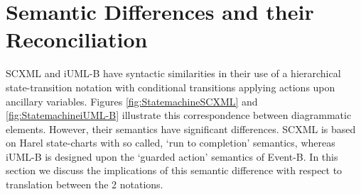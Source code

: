 
\section{Semantic Differences and their Reconciliation}
\label{sect:diff}


SCXML and iUML-B have syntactic similarities in their use of a hierarchical state-transition notation with conditional transitions applying actions upon ancillary variables.
Figures \ref{fig:StatemachineSCXML} and \ref{fig:StatemachineiUML-B} illustrate this correspondence between diagrammatic elements. 
However, their semantics have significant differences. SCXML is based on Harel state-charts with so called, `run to completion' semantics, whereas iUML-B is designed upon the `guarded action' semantics of Event-B.
In this section we discuss the implications of this semantic difference with respect to translation between the 2 notations.


